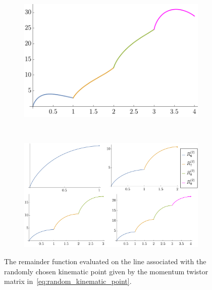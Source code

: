 \documentclass[11pt]{article}
\begin{document}
\begin{figure}[t]
\captionsetup[subfigure]{labelformat=empty}
\begin{center}
  \begin{subfigure}[b]{0.6\textwidth}
    \includegraphics[width=\textwidth]{rand_point_line.pdf}
  \end{subfigure}
\  %
  \begin{subfigure}[t]{0.1\textwidth} \vspace{-5cm}
    \includegraphics[width=\textwidth]{symmetric_lines_label.pdf}
  \end{subfigure}
    \caption{The remainder function evaluated on the line associated with the randomly chosen kinematic point given by the momentum twistor matrix in~\eqref{eq:random_kinematic_point}.}
    \label{fig:random_point_to_collinear_lines}
\end{center}
\end{figure}
\end{document}
